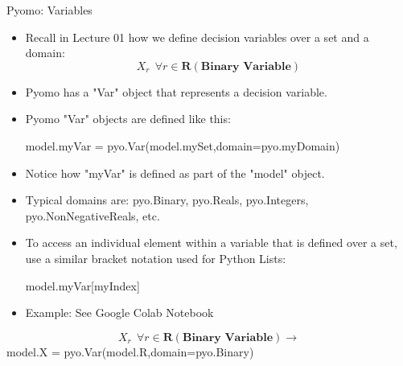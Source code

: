 \documentclass[10pt, aspectratio=169]{beamer}
\begin{document}
\begin{frame}{Pyomo: Variables}
    \begin{itemize}
        \item Recall in Lecture 01 how we define decision variables over a set and a domain:
        $$X_r \ \ \forall r \in \textbf{R} \left(\textbf{Binary\ Variable}\right)$$
        \item Pyomo has a "Var" object that represents a decision variable.
        \item Pyomo "Var" objects are defined like this:
        
        \hspace{0.25cm} model.myVar = pyo.Var(model.mySet,domain=pyo.myDomain)
        \item Notice how "myVar" is defined as part of the "model" object.
        \item Typical domains are: pyo.Binary, pyo.Reals, pyo.Integers, pyo.NonNegativeReals, etc.
        \item To access an individual element within a variable that is defined over a set, use a similar bracket notation used for Python Lists:
        
        \hspace{0.25cm} model.myVar[myIndex]

        \item Example: See Google Colab Notebook
    \end{itemize}
    \begin{center}
        $$X_r \ \ \forall r \in \textbf{R} \left(\textbf{Binary\ Variable}\right) \rightarrow $$ model.X = pyo.Var(model.R,domain=pyo.Binary)
    \end{center}
\end{frame}
\end{document}
